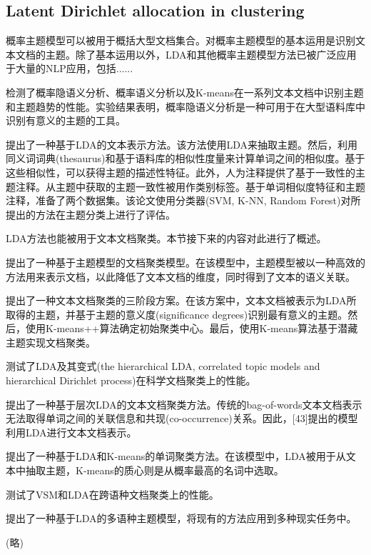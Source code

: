 \documentclass{article}
\begin{document}
\subsection{Latent Dirichlet allocation in clustering}
概率主题模型可以被用于概括大型文档集合。对概率主题模型的基本运用是识别文本文档的主题。除了基本运用以外，LDA和其他概率主题模型方法已被广泛应用于大量的NLP应用，包括......\par
[41]检测了概率隐语义分析、概率语义分析以及K-means在一系列文本文档中识别主题和主题趋势的性能。实验结果表明，概率隐语义分析是一种可用于在大型语料库中识别有意义的主题的工具。\par
[42]提出了一种基于LDA的文本表示方法。该方法使用LDA来抽取主题。然后，利用同义词词典(thesaurus)和基于语料库的相似性度量来计算单词之间的相似度。基于这些相似性，可以获得主题的描述性特征。此外，人为注释提供了基于一致性的主题注释。从主题中获取的主题一致性被用作类别标签。基于单词相似度特征和主题注释，准备了两个数据集。该论文使用分类器(SVM, K-NN, Random Forest)对所提出的方法在主题分类上进行了评估。\par
LDA方法也能被用于文本文档聚类。本节接下来的内容对此进行了概述。\par
[43]提出了一种基于主题模型的文档聚类模型。在该模型中，主题模型被以一种高效的方法用来表示文档，以此降低了文本文档的维度，同时得到了文本的语义关联。\par
[44]提出了一种文本文档聚类的三阶段方案。在该方案中，文本文档被表示为LDA所取得的主题，并基于主题的意义度(significance degrees)识别最有意义的主题。然后，使用K-means++算法确定初始聚类中心。最后，使用K-means算法基于潜藏主题实现文档聚类。\par
[45]测试了LDA及其变式(the hierarchical LDA, correlated topic
models and hierarchical Dirichlet process)在科学文档聚类上的性能。\par
[46]提出了一种基于层次LDA的文本文档聚类方法。传统的bag-of-words文本文档表示无法取得单词之间的关联信息和共现(co-occurrence)关系。因此，[43]提出的模型利用LDA进行文本文档表示。\par
[47]提出了一种基于LDA和K-means的单词聚类方法。在该模型中，LDA被用于从文本中抽取主题，K-means的质心则是从概率最高的名词中选取。\par
[48]测试了VSM和LDA在跨语种文档聚类上的性能。\par
[49]提出了一种基于LDA的多语种主题模型，将现有的方法应用到多种现实任务中。\par
[50](略)
\end{document}
